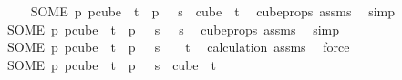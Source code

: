 \begin{isabellebody}
%
\isadelimproof
%
\endisadelimproof
%
\isatagproof
{}\isamarkupfalse%
{\isacharminus}{\kern0pt}\isanewline
\ \ \isamarkupfalse%
\ {\isacharasterisk}{\kern0pt}{\isacharcolon}{\kern0pt}\ {\isachardoublequoteopen}{\isacharparenleft}{\kern0pt}SOME\ p{\isachardot}{\kern0pt}\ p{\isasymin}cube\ {}\ {\isacharparenleft}{\kern0pt}t{\isacharplus}{\kern0pt}{}{\isacharparenright}{\kern0pt}\ {\isasymand}\ p\ {}\ {\isacharequal}{\kern0pt}\ s{\isacharparenright}{\kern0pt}\ {\isasymin}\ cube\ {}\ {\isacharparenleft}{\kern0pt}t{\isacharplus}{\kern0pt}{}{\isacharparenright}{\kern0pt}{\isachardoublequoteclose}\ \isamarkupfalse%
\ cube{\isacharunderscore}{\kern0pt}props\ assms\ \isamarkupfalse%
\ simp\isanewline
\ \ \isamarkupfalse%
\ \isamarkupfalse%
\ {\isachardoublequoteopen}{\isacharparenleft}{\kern0pt}SOME\ p{\isachardot}{\kern0pt}\ p{\isasymin}cube\ {}\ {\isacharparenleft}{\kern0pt}t{\isacharplus}{\kern0pt}{}{\isacharparenright}{\kern0pt}\ {\isasymand}\ p\ {}\ {\isacharequal}{\kern0pt}\ s{\isacharparenright}{\kern0pt}\ {}\ {\isacharequal}{\kern0pt}\ s{\isachardoublequoteclose}\ \isamarkupfalse%
\ cube{\isacharunderscore}{\kern0pt}props\ assms\ \isamarkupfalse%
\ simp\isanewline
\ \ \isamarkupfalse%
\isanewline
\ \ \isacommand{{\isacharbraceleft}{\kern0pt}}\isamarkupfalse%
\isanewline
\ \ \ \ \isamarkupfalse%
\ {\isachardoublequoteopen}{\isacharparenleft}{\kern0pt}SOME\ p{\isachardot}{\kern0pt}\ p{\isasymin}cube\ {}\ {\isacharparenleft}{\kern0pt}t{\isacharplus}{\kern0pt}{}{\isacharparenright}{\kern0pt}\ {\isasymand}\ p\ {}\ {\isacharequal}{\kern0pt}\ s{\isacharparenright}{\kern0pt}\ {\isacharbackquote}{\kern0pt}\ {\isacharbraceleft}{\kern0pt}{\isachardot}{\kern0pt}{\isachardot}{\kern0pt}{\isacharless}{\kern0pt}{}{\isacharbraceright}{\kern0pt}\ {\isasymsubseteq}\ {\isacharbraceleft}{\kern0pt}{\isachardot}{\kern0pt}{\isachardot}{\kern0pt}{\isacharless}{\kern0pt}t{\isacharbraceright}{\kern0pt}{\isachardoublequoteclose}\ \isamarkupfalse%
\ calculation\ assms\ \isamarkupfalse%
\ force\isanewline
\ \ \ \ \isamarkupfalse%
\ \isamarkupfalse%
\ {\isachardoublequoteopen}{\isacharparenleft}{\kern0pt}SOME\ p{\isachardot}{\kern0pt}\ p{\isasymin}cube\ {}\ {\isacharparenleft}{\kern0pt}t{\isacharplus}{\kern0pt}{}{\isacharparenright}{\kern0pt}\ {\isasymand}\ p\ {}\ {\isacharequal}{\kern0pt}\ s{\isacharparenright}{\kern0pt}\ {\isasymin}\ cube\ {}\ t{\isachardoublequoteclose}\ \isamarkupfalse%

\end{isabellebody}
